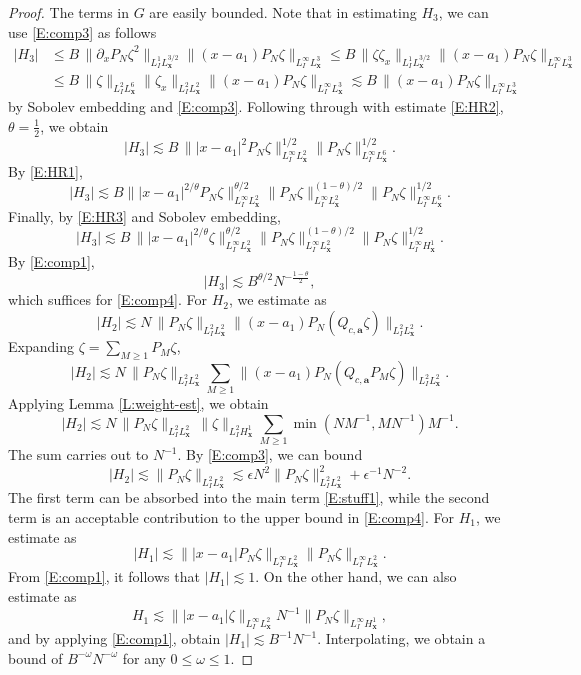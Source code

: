 \documentclass[12pt,letterpaper]{amsart}
\theoremstyle{remark}
\numberwithin{equation}{section}
\numberwithin{theorem}{section}
\numberwithin{table}{section}
\begin{document}
\begin{proof}
The terms in $G$ are easily bounded.  Note that in estimating $H_3$, we can use \eqref{E:comp3} as follows
\begin{align*}
|H_3| &\leq B \,\| \partial_x P_N \zeta^2 \|_{L_I^1L_{\mathbf{x}}^{3/2}} \| (x-a_1) P_N \zeta \|_{L_I^\infty L_{\mathbf{x}}^3} 
\leq B \, \| \zeta \zeta_x \|_{L_I^1L_{\mathbf{x}}^{3/2}} \| (x-a_1) P_N \zeta \|_{L_I^\infty L_{\mathbf{x}}^3} \\
&\leq B \,\| \zeta\|_{L_I^2 L_{\mathbf{x}}^6} \| \zeta_x \|_{L_I^2L_{\mathbf{x}}^2} \| (x-a_1) P_N \zeta \|_{L_I^\infty L_{\mathbf{x}}^3} 
\lesssim B\, \| (x-a_1) P_N \zeta \|_{L_I^\infty L_{\mathbf{x}}^3}
\end{align*}
by Sobolev embedding and \eqref{E:comp3}.  Following through with estimate \eqref{E:HR2}, $\theta=\frac12$, we obtain
$$
|H_3| \lesssim B\, \| |x-a_1|^2 P_N\zeta \|_{L_I^\infty L_\mathbf{x}^2}^{1/2} \| P_N \zeta \|_{L_I^\infty L_{\mathbf{x}}^6}^{1/2}.
$$
By \eqref{E:HR1},
$$
|H_3| \lesssim B \| |x-a_1|^{2/\theta} P_N\zeta \|_{L_I^\infty L_\mathbf{x}^2}^{\theta/2}  \|  P_N\zeta \|_{L_I^\infty L_\mathbf{x}^2}^{(1-\theta)/2} \| P_N \zeta \|_{L_I^\infty L_{\mathbf{x}}^6}^{1/2}.
$$
Finally, by \eqref{E:HR3} and Sobolev embedding,
$$
|H_3| \lesssim B\, \| |x-a_1|^{2/\theta} \zeta \|_{L_I^\infty L_\mathbf{x}^2}^{\theta/2}  \|  P_N\zeta \|_{L_I^\infty L_\mathbf{x}^2}^{(1-\theta)/2} \| P_N \zeta \|_{L_I^\infty H_{\mathbf{x}}^1}^{1/2}.
$$
By \eqref{E:comp1}, 
$$
|H_3| \lesssim B^{\theta/2} N^{-\frac{1-\theta}{2}},
$$
which suffices for \eqref{E:comp4}.   For $H_2$, we estimate as
$$
|H_2| \lesssim N \, \| P_N \zeta \|_{L_I^2 L_{\mathbf{x}}^2} \| (x-a_1) P_N ( Q_{c,\mathbf{a}} \zeta) \|_{L_I^2 L_{\mathbf{x}}^2}.
$$
Expanding $\zeta = \sum_{M\geq 1} P_M \zeta$,
$$
|H_2| \lesssim N \, \| P_N \zeta \|_{L_I^2 L_{\mathbf{x}}^2} \sum_{M \geq 1} \| (x-a_1) P_N ( Q_{c,\mathbf{a}} P_M \zeta) \|_{L_I^2 L_{\mathbf{x}}^2}.
$$
Applying Lemma \ref{L:weight-est}, we obtain
$$
|H_2| \lesssim N \, \| P_N \zeta \|_{L_I^2 L_{\mathbf{x}}^2} \, \| \zeta \|_{L_I^2 H_\mathbf{x}^1}  \sum_{M \geq 1} \min (NM^{-1}, MN^{-1}) M^{-1}.
$$
The sum carries out to $N^{-1}$.  By \eqref{E:comp3}, we can bound
$$
|H_2| \lesssim \| P_N \zeta \|_{L_I^2 L_{\mathbf{x}}^2} \lesssim \epsilon N^2\|P_N \zeta\|_{L_I^2 L_{\mathbf{x}}^2}^2 + \epsilon^{-1} N^{-2}.
$$
The first term can be absorbed into the main term \eqref{E:stuff1}, while the second term is an acceptable contribution to the upper bound in \eqref{E:comp4}.  For $H_1$, we estimate as
$$
|H_1| \lesssim \| |x-a_1| P_N \zeta \|_{L_I^\infty L_{\mathbf{x}}^2} \| P_N \zeta \|_{L_I^\infty L_{\mathbf{x}}^2}. 
$$
From \eqref{E:comp1}, it follows that $|H_1| \lesssim 1$.  On the other hand, we can also estimate as
$$
H_1 \lesssim  \| |x-a_1| \zeta \|_{L_I^\infty L_{\mathbf{x}}^2}  N^{-1} \| P_N \zeta \|_{L_I^\infty H_{\mathbf{x}}^1},
$$
and by applying \eqref{E:comp1}, obtain $|H_1| \lesssim B^{-1}N^{-1}$.  Interpolating, we obtain a bound of $B^{-\omega} N^{-\omega}$ for any $0\leq \omega \leq 1$.
\end{proof}
\end{document}
